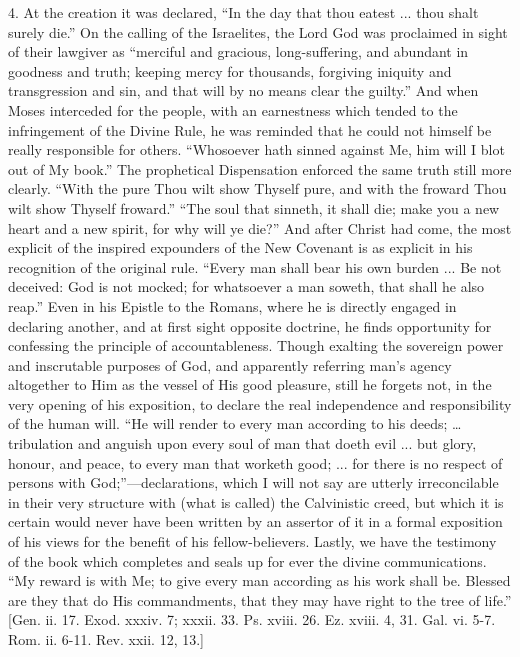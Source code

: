 4. At the creation it was declared, ``In the day that thou
eatest ... thou shalt surely die.'' On the calling of the
Israelites, the Lord God was proclaimed in sight of their lawgiver as
``merciful and gracious, long-suffering, and abundant in goodness
and truth; keeping mercy for thousands, forgiving iniquity and
transgression and sin, and that will by no means clear the
guilty.'' And when Moses interceded for the people, with an
earnestness which tended to the infringement of the Divine Rule, he
was reminded that he could not himself be really responsible for
others. ``Whosoever hath sinned against Me, him will I blot out of
My book.'' The prophetical Dispensation enforced the same truth
still more clearly. ``With the pure Thou wilt show Thyself pure,
and with the froward Thou wilt show Thyself froward.'' ``The
soul that sinneth, it shall die; make you a new heart and a new
spirit, for why will ye die?'' And after Christ had come, the most
explicit of the inspired expounders of the New Covenant is as explicit
in his recognition of the original rule. ``Every man shall bear
his own burden ... Be not deceived: God is not mocked; for whatsoever
a man soweth, that shall he also reap.'' Even in his Epistle to
the Romans, where he is directly engaged in declaring another, and at
first sight opposite doctrine, he finds opportunity for confessing the
principle of accountableness. Though exalting the sovereign power and
inscrutable purposes of God, and apparently referring man's agency
altogether to Him as the vessel of His good pleasure, still he forgets
not, in the very opening of his exposition, to declare the real
independence and responsibility of the human will. ``He will
render to every man according to his deeds; … tribulation and
anguish upon every soul of man that doeth evil ... but glory, honour,
and peace, to every man that worketh good; ... for there is no respect
of persons with God;''—declarations, which I will not say are
utterly irreconcilable in their very structure with (what is called)
the Calvinistic creed, but which it is certain would never have been
written by an assertor of it in a formal exposition of his views for
the benefit of his fellow-believers. Lastly, we have the testimony of
the book which completes and seals up for ever the divine
communications. ``My reward is with Me; to give every man
according as his work shall be. Blessed are they that do His
commandments, that they may have right to the tree of life.''
[Gen. ii. 17. Exod. xxxiv. 7; xxxii. 33. Ps. xviii. 26. Ez. xviii. 4,
31. Gal. vi. 5-7. Rom. ii. 6-11. Rev. xxii. 12, 13.]

